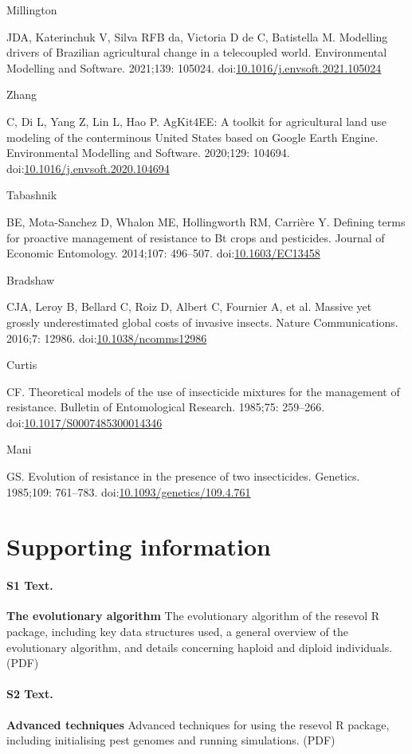 \documentclass[10pt,letterpaper]{article}
\begin{document}
\begin{thebibliography}{30}
\hypertarget{ref-Millington2021}{Millington} JDA, Katerinchuk V, Silva RFB da, Victoria D de C, Batistella M. {Modelling drivers of Brazilian agricultural change in a telecoupled world}. Environmental Modelling and Software. 2021;139: 105024. doi:\href{https://doi.org/10.1016/j.envsoft.2021.105024}{10.1016/j.envsoft.2021.105024}

\hypertarget{ref-Zhang2020}{Zhang} C, Di L, Yang Z, Lin L, Hao P. {AgKit4EE: A toolkit for agricultural land use modeling of the conterminous United States based on Google Earth Engine}. Environmental Modelling and Software. 2020;129: 104694. doi:\href{https://doi.org/10.1016/j.envsoft.2020.104694}{10.1016/j.envsoft.2020.104694}

\hypertarget{ref-Tabashnik2014}{Tabashnik} BE, Mota-Sanchez D, Whalon ME, Hollingworth RM, Carri\`{e}re Y. {Defining terms for proactive management of resistance to Bt crops and pesticides}. Journal of Economic Entomology. 2014;107: 496--507. doi:\href{https://doi.org/10.1603/EC13458}{10.1603/EC13458}

\hypertarget{ref-Bradshaw2016}{Bradshaw} CJA, Leroy B, Bellard C, Roiz D, Albert C, Fournier A, et al. {Massive yet grossly underestimated global costs of invasive insects}. Nature Communications. 2016;7: 12986. doi:\href{https://doi.org/10.1038/ncomms12986}{10.1038/ncomms12986}

\hypertarget{ref-Curtis1985}{Curtis} CF. {Theoretical models of the use of insecticide mixtures for the management of resistance}. Bulletin of Entomological Research. 1985;75: 259--266. doi:\href{https://doi.org/10.1017/S0007485300014346}{10.1017/S0007485300014346}

\hypertarget{ref-Mani1985}{Mani} GS. {Evolution of resistance in the presence of two insecticides.} Genetics. 1985;109: 761--783. doi:\href{https://doi.org/10.1093/genetics/109.4.761}{10.1093/genetics/109.4.761}

\end{thebibliography}


\section*{Supporting information}

\paragraph*{S1 Text.}
\label{S1_Text}
{\bf The evolutionary algorithm} The evolutionary algorithm of the resevol R package, including key data structures used, a general overview of the evolutionary algorithm, and details concerning haploid and diploid individuals. (PDF)


\paragraph*{S2 Text.}
\label{S2_Text}
{\bf Advanced techniques}  Advanced techniques for using the resevol R package, including initialising pest genomes and running simulations. (PDF)
\end{document}
